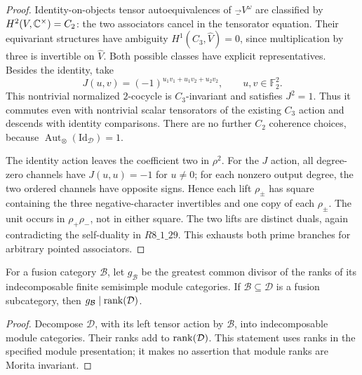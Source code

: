 \begin{proof}
Identity-on-objects tensor autoequivalences of $\Vec_V^\omega$ are classified by $H^2(V,\mathbb C^\times)=C_2$: the two associators cancel in the tensorator equation. Their equivariant structures have ambiguity $H^1(C_3,\widehat V)=0$, since multiplication by three is invertible on $\widehat V$. Both possible classes have explicit representatives. Besides the identity, take
\[
J(u,v)=(-1)^{u_1v_1+u_1v_2+u_2v_2},\qquad u,v\in\mathbb F_2^2.
\]
This nontrivial normalized $2$-cocycle is $C_3$-invariant and satisfies $J^2=1$. Thus it commutes even with nontrivial scalar tensorators of the existing $C_3$ action and descends with identity comparisons. There are no further $C_2$ coherence choices, because $\operatorname{Aut}_{\otimes}(\mathrm{Id}_{\mathcal D})=1$.

The identity action leaves the coefficient two in $\rho^2$. For the $J$ action, all degree-zero channels have $J(u,u)=-1$ for $u\ne0$; for each nonzero output degree, the two ordered channels have opposite signs. Hence each lift $\rho_\pm$ has square containing the three negative-character invertibles and one copy of each $\rho_\pm$. The unit occurs in $\rho_+\rho_-$, not in either square. The two lifts are distinct duals, again contradicting the self-duality in $R8\_1\_29$. This exhausts both prime branches for arbitrary pointed associators.
\end{proof}

\begin{lemma}\label{lem:modulegcd}
For a fusion category $\mathcal B$, let $g_{\mathcal B}$ be the greatest common divisor of the ranks of its indecomposable finite semisimple module categories. If $\mathcal B\subseteq\mathcal D$ is a fusion subcategory, then $g_{\mathcal B}\mid\operatorname{rank}(\mathcal D)$.
\end{lemma}
\begin{proof}
Decompose $\mathcal D$, with its left tensor action by $\mathcal B$, into indecomposable module categories. Their ranks add to $\operatorname{rank}(\mathcal D)$. This statement uses ranks in the specified module presentation; it makes no assertion that module ranks are Morita invariant.
\end{proof}

